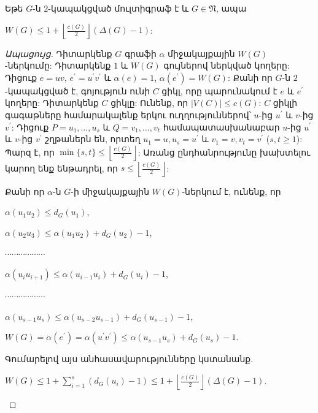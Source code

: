 \begin{theorem}
\label{t1_upper_circumference} Եթե $G$-ն $2$-կապակցված մուլտիգրաֆ է և $G\in \mathfrak{N}$, ապա
\begin{center}
$W(G)\leq 1+\left\lfloor \frac{c(G)}{2}\right\rfloor(\Delta(G)-1)$:
\end{center}
\end{theorem}
\begin{proof}[Ապացույց] Դիտարկենք $G$ գրաֆի $\alpha$ միջակայքային $W(G)$-ներկումը: Դիտարկենք  $1$ և $W(G)$ գույներով ներկված կողերը: Դիցուք $e=uv$,
$e^{\prime}=u^{\prime}v^{\prime}$ և $\alpha(e)=1$,
$\alpha(e^{\prime})=W(G)$: Քանի որ $G$-ն $2$-կապակցված է, գոյություն ունի $C$ ցիկլ, որը պարունակում է $e$ և $e^{\prime}$ կողերը: Դիտարկենք $C$ ցիկլը: Ունենք, որ $\vert V(C)\vert\leq c(G)$: $C$ ցիկլի գագաթները համարակալենք երկու ուղղություններով՝ $u$-ից $u^{\prime}$ և $v$-ից $v^{\prime}$: Դիցուք 
$P=u_{1},\ldots,u_{s}$ և $Q=v_{1},\ldots,v_{t}$ համապատասխանաբար
$u$-ից $u^{\prime}$ և $v$-ից $v^{\prime}$ շղթաներն են, որտեղ
$u_{1}=u,u_{s}=u^{\prime}$ և $v_{1}=v,v_{t}=v^{\prime}$
($s,t\geq 1$): Պարզ է, որ $\min\{s,t\}\leq \left\lfloor
\frac{c(G)}{2}\right\rfloor$: Առանց ընդհանրությունը խախտելու կարող ենք ենթադրել, որ $s\leq \left\lfloor \frac{c(G)}{2}\right\rfloor$:

Քանի որ $\alpha$-ն $G$-ի միջակայքային $W(G)$-ներկում է, ունենք, որ

\begin{center}
$\alpha(u_{1}u_{2})\leq d_{G}(u_{1})$,

$\alpha(u_{2}u_{3})\leq \alpha(u_{1}u_{2})+ d_{G}(u_{2})-1$,

$\cdots \cdots \cdots \cdots \cdots \cdots$

$\alpha(u_{i}u_{i+1})\leq \alpha(u_{i-1}u_{i})+ d_{G}(u_{i})-1$,

$\cdots \cdots \cdots \cdots \cdots \cdots$

$\alpha(u_{s-1}u_{s})\leq \alpha(u_{s-2}u_{s-1})+ d_{G}(u_{s-1})-1$,

$W(G)=\alpha(e^{\prime})=\alpha(u^{\prime}v^{\prime})\leq
\alpha(u_{s-1}u_{s})+ d_{G}(u_{s})-1$.

\end{center}

Գումարելով այս անհասավարությունները կստանանք.

\begin{center}
$W(G)\leq 1+{\sum\limits_{i=1}^{s}\left(d_{G}(u_{i})-1\right)}\leq
1+\left\lfloor\frac{c(G)}{2}\right\rfloor(\Delta(G)-1)$.
\end{center}
\end{proof}

